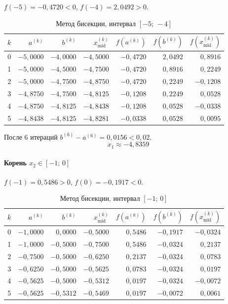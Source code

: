 \documentclass[a4paper,12pt]{article}
\begin{document}
$f(-5) = -0{,}4720 < 0$, \quad $f(-4) = 2{,}0492 > 0$.
\begin{table}[H]
\centering
\caption{Метод бисекции, интервал $[-5;\,-4]$}
\begin{tabular}{crrrrrr}
\toprule
$k$ & $a^{(k)}$ & $b^{(k)}$ & $x^{(k)}_{\text{mid}}$ & $f(a^{(k)})$ & $f(b^{(k)})$ & $f(x^{(k)}_{\text{mid}})$ \\
\midrule
0 & $-5{,}0000$ & $-4{,}0000$ & $-4{,}5000$ & $-0{,}4720$ & $2{,}0492$ & $0{,}8916$  \\
1 & $-5{,}0000$ & $-4{,}5000$ & $-4{,}7500$ & $-0{,}4720$ & $0{,}8916$ & $0{,}2249$  \\
2 & $-5{,}0000$ & $-4{,}7500$ & $-4{,}8750$ & $-0{,}4720$ & $0{,}2249$ & $-0{,}1208$ \\
3 & $-4{,}8750$ & $-4{,}7500$ & $-4{,}8125$ & $-0{,}1208$ & $0{,}2249$ & $0{,}0528$  \\
4 & $-4{,}8750$ & $-4{,}8125$ & $-4{,}8438$ & $-0{,}1208$ & $0{,}0528$ & $-0{,}0338$ \\
5 & $-4{,}8438$ & $-4{,}8125$ & $-4{,}8281$ & $-0{,}0338$ & $0{,}0528$ & $0{,}0095$  \\
\bottomrule
\end{tabular}
\end{table}

После 6 итераций $b^{(6)}-a^{(6)} = 0{,}0156 < 0{,}02$.
\[
\boxed{x_1 \approx -4{,}8359}
\]

\paragraph{Корень $x_2 \in [-1;\,0]$}

$f(-1) = 0{,}5486 > 0$, \quad $f(0) = -0{,}1917 < 0$.
\begin{table}[H]
\centering
\caption{Метод бисекции, интервал $[-1;\,0]$}
\begin{tabular}{crrrrrr}
\toprule
$k$ & $a^{(k)}$ & $b^{(k)}$ & $x^{(k)}_{\text{mid}}$ & $f(a^{(k)})$ & $f(b^{(k)})$ & $f(x^{(k)}_{\text{mid}})$ \\
\midrule
0 & $-1{,}0000$ & $0{,}0000$ & $-0{,}5000$ & $0{,}5486$  & $-0{,}1917$ & $-0{,}0324$ \\
1 & $-1{,}0000$ & $-0{,}5000$ & $-0{,}7500$ & $0{,}5486$ & $-0{,}0324$ & $0{,}2137$  \\
2 & $-0{,}7500$ & $-0{,}5000$ & $-0{,}6250$ & $0{,}2137$ & $-0{,}0324$ & $0{,}0783$  \\
3 & $-0{,}6250$ & $-0{,}5000$ & $-0{,}5625$ & $0{,}0783$ & $-0{,}0324$ & $0{,}0197$  \\
4 & $-0{,}5625$ & $-0{,}5000$ & $-0{,}5312$ & $0{,}0197$ & $-0{,}0324$ & $-0{,}0072$ \\
5 & $-0{,}5625$ & $-0{,}5312$ & $-0{,}5469$ & $0{,}0197$ & $-0{,}0072$ & $0{,}0061$  \\
\bottomrule
\end{tabular}
\end{table}
\end{document}
